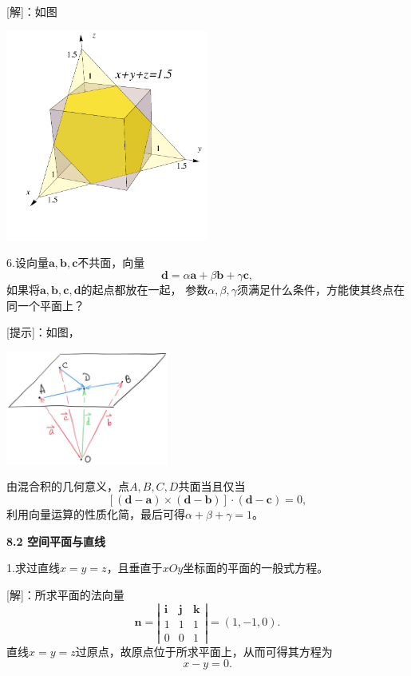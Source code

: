 [解]：如图
\begin{center}
	\includegraphics[width=0.5\textwidth]{./images/ch8/HexCubic.pdf}
\end{center}
\fin

6.设向量$\bm{a},\bm{b},\bm{c}$不共面，向量
$$\bm{d}=\alpha\bm{a}+\beta\bm{b}+\gamma\bm{c},$$
如果将$\bm{a},\bm{b},\bm{c},\bm{d}$的起点都放在一起，
参数$\alpha,\beta,\gamma$须满足什么条件，方能使其终点在同一个平面上？

[提示]：如图，
\begin{center}
	\includegraphics[width=0.4\textwidth]{./images/ch8/abcd.jpg}
\end{center}
由混合积的几何意义，点$A,B,C,D$共面当且仅当
$$[(\bm{d}-\bm{a})\times(\bm{d}-\bm{b})]\cdot(\bm{d}-\bm{c})=0,$$
利用向量运算的性质化简，最后可得$\alpha+\beta+\gamma=1$。\fin

\begin{center}
	\bf 8.2 空间平面与直线
\end{center}

1.求过直线$x=y=z$，且垂直于$xOy$坐标面的平面的一般式方程。

[解]：所求平面的法向量
$$\bm{n}=\left|\begin{array}{ccc}
	\bm{i} & \bm{j} & \bm{k}\\
	1 & 1 & 1 \\
	0 & 0 & 1
\end{array}\right|=(1,-1,0).$$
直线$x=y=z$过原点，故原点位于所求平面上，从而可得其方程为
$$x-y=0.$$
\fin

